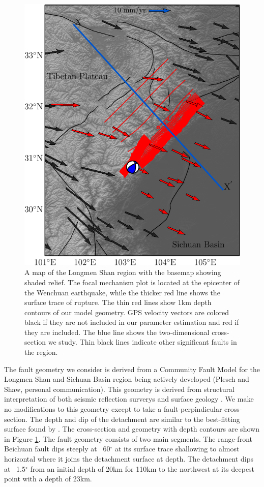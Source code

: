 \documentclass[12pt]{article}
\begin{document}
\begin{figure}[h!]
    \centering
    \includegraphics{figs/lms_map_all.pdf}
    \caption{A map of the Longmen Shan region with the basemap showing shaded relief. The focal mechanism plot is located at the epicenter of the Wenchuan earthquake, while the thicker red line shows the surface trace of rupture. The thin red lines show 1km depth contours of our model geometry. GPS velocity vectors are colored black if they are not included in our parameter estimation and red if they are included. The blue line shows the two-dimensional cross-section we study. Thin black lines indicate other significant faults in the region.}
    \label{fig:regional_map}
\end{figure}

The fault geometry we consider is derived from a Community Fault Model for the Longmen Shan and Sichuan Basin region being actively developed (Plesch and Shaw, personal communication). This geometry is derived from structural interpretation of both seismic reflection surverys and surface geology \citep{Hubbard2010}. We make no modifications to this geometry except to take a fault-perpindicular cross-section. The depth and dip of the detachment are similar to the best-fitting surface found by \citet{Qi2011}. The cross-section and geometry with depth contours are shown in Figure \ref{fig:regional_map}. The fault geometry consists of two main segments. The range-front Beichuan fault dips steeply at ~60$^{\circ}$ at its surface trace shallowing to almost horizontal where it joins the detachment surface at depth. The detachment dips at ~1.5$^{\circ}$ from an initial depth of 20km for 110km to the northwest at its deepest point with a depth of 23km.
\end{document}
